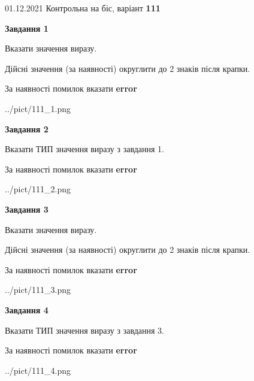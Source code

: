 \documentclass[11pt, ukrainian]{article}
\begin{document}
{01.12.2021 Контрольна на біс, варіант  \No \textbf { 111 }\par}
{
\begin {large}
{\begin {center}\textbf{Завдання 1}\end {center}}\par
Вказати значення виразу. \par
Дійсні значення (за наявності) округлити до 2 знаків після крапки. \par
За наявності помилок вказати \textbf{error}

\begin{center}
	{../pict/111_1.png}
\end{center}
\newpage

{\begin {center}\textbf{Завдання 2}\end {center}}\par
Вказати ТИП значення виразу з завдання 1. \par
За наявності помилок вказати \textbf{error}

\begin{center}
	{../pict/111_2.png}
\end{center}
\newpage

{\begin {center}\textbf{Завдання 3}\end {center}}\par
Вказати значення виразу. \par
Дійсні значення (за наявності) округлити до 2 знаків після крапки. \par
За наявності помилок вказати \textbf{error}

\begin{center}
	{../pict/111_3.png}
\end{center}
\newpage

{\begin {center}\textbf{Завдання 4}\end {center}}\par
Вказати ТИП значення виразу з завдання 3. \par
За наявності помилок вказати \textbf{error}

\begin{center}
	{../pict/111_4.png}
\end{center}
\newpage


\end{large}}
\end{document}
